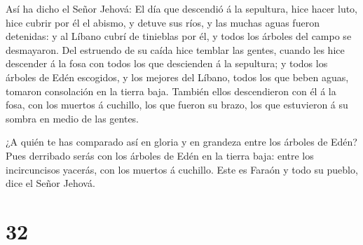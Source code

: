  Así ha dicho el Señor Jehová: El día que descendió á la
sepultura, hice hacer luto, hice cubrir por él el abismo, y detuve sus
ríos, y las muchas aguas fueron detenidas: y al Líbano cubrí de
tinieblas por él, y todos los árboles del campo se desmayaron.
 Del estruendo de su caída hice temblar las gentes, cuando
les hice descender á la fosa con todos los que descienden á la
sepultura; y todos los árboles de Edén escogidos, y los mejores del
Líbano, todos los que beben aguas, tomaron consolación en la tierra
baja.  También ellos descendieron con él á la fosa, con los
muertos á cuchillo, los que fueron su brazo, los que estuvieron á su
sombra en medio de las gentes.

 ¿A quién te has comparado así en gloria y en grandeza
entre los árboles de Edén? Pues derribado serás con los árboles de Edén
en la tierra baja: entre los incircuncisos yacerás, con los muertos á
cuchillo. Este es Faraón y todo su pueblo, dice el Señor Jehová.

\hypertarget{section-31}{%
\section{32}\label{section-31}}

